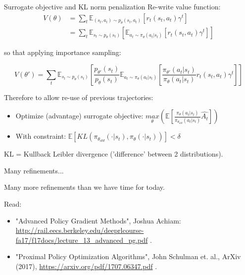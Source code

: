 \documentclass{beamer}
\begin{document}
\begin{frame}{Surrogate objective and KL norm penalization}
Re-write value function:
\begin{align*}
    V(\theta) &= \sum_t \mathbb{E}_{(s_t, a_t) \sim p_{\theta}(s_t, a_t)} [r_t(s_t, a_t) \gamma^t] \\
              &= \sum_t \mathbb{E}_{s_t \sim p_\theta(s_t)} [\mathbb{E}_{a_t \sim \pi_\theta(a_t | s_t)} [r_t(s_t, a_t) \gamma^t]]
\end{align*}    

    so that applying importance sampling:
    
$$ V(\theta') = \sum_t \mathbb{E}_{s_t \sim p_\theta(s_t)} \left[ \frac{p_{\theta'}(s_t)}{p_\theta(s_t)}  \mathbb{E}_{a_t \sim \pi_\theta(a_t | s_t)} \left[ \frac{\pi_{\theta'}(a_t | s_t)}{\pi_\theta(a_t | s_t)} r_t(s_t, a_t) \gamma^t \right] \right] $$
    
    Therefore to allow re-use of previous trajectories:
    
\begin{itemize}
  \item Optimize (advantage) surrogate objective: $\underset{\theta}{max} \left( \mathbb{E}  \left[ \frac{\pi_\theta (a_t \vert s_t)}{\pi_{\theta_{old}} (a_t \vert s_t)} \hat{A_t} \right] \right) $
  \item With constraint: $ \mathbb{E} \left[ KL( \pi_{\theta_{old}}( \cdot | s_t), \pi_{\theta}( \cdot | s_t)) \right] < \delta $
\end{itemize}

KL = Kullback Leibler divergence ('difference' between 2 distributions).
    
\end{frame}


\begin{frame}{Many refinements...}

Many more refinements than we have time for today.

Read:

\begin{itemize}
    \item "Advanced Policy Gradient Methods", Joshua Achiam: \url{http://rail.eecs.berkeley.edu/deeprlcourse-fa17/f17docs/lecture_13_advanced_pg.pdf} .
    \item "Proximal Policy Optimization Algorithms", John Schulman et. al., ArXiv (2017), \url{https://arxiv.org/pdf/1707.06347.pdf} .
\end{itemize}

\end{frame}
\end{document}
